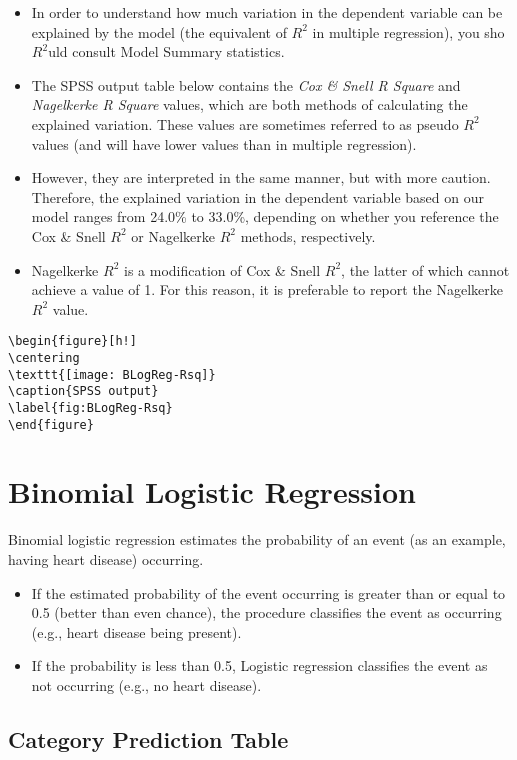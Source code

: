 \documentclass[12pt, a4paper]{article}
\theoremstyle{plain}
\theoremstyle{definition}
\theoremstyle{remark}
\begin{document}
\begin{itemize}
	\item In order to understand how much variation in the dependent variable can be explained by the model (the equivalent of $R^2$ in multiple regression), you sho$R^2$uld consult Model Summary statistics.
	
	\item The SPSS output table below contains the \textit{Cox \& Snell R Square} and \textit{Nagelkerke R Square }values, which are both methods of calculating the explained variation. These values are sometimes referred to as pseudo $R^2$ values (and will have lower values than in multiple regression).
	\item  However, they are interpreted in the same manner, but with more caution. Therefore, the explained variation in the dependent variable based on our model ranges from 24.0\% to 33.0\%, depending on whether you reference the Cox \& Snell $R^2$ or Nagelkerke $R^2$ methods, respectively. 
	
	\item Nagelkerke $R^2$ is a modification of Cox \& Snell $R^2$, the latter of which cannot achieve a value of 1. For this reason, it is preferable to report the Nagelkerke $R^2$ value.
\end{itemize}
\begin{verbatim}
\begin{figure}[h!]
\centering
\texttt{[image: BLogReg-Rsq]}
\caption{SPSS output}
\label{fig:BLogReg-Rsq}
\end{figure}
\end{verbatim}


\section{Binomial Logistic Regression}
Binomial logistic regression estimates the probability of an event (as an example, having heart disease) occurring. 
\begin{itemize}
	\item If the estimated probability of the event occurring is greater than or equal to 0.5 (better than even chance), the procedure classifies the event as occurring (e.g., heart disease being present). \item If the probability is less than 0.5, Logistic regression classifies the event as not occurring (e.g., no heart disease). 
\end{itemize}
\subsection{Category Prediction Table}
\end{document}
